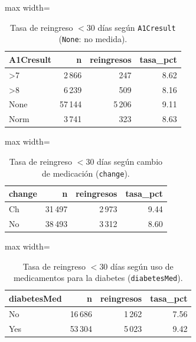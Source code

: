 \documentclass[11pt,a4paper]{article}
\newcommand{\cod}[1]{\texttt{#1}}
\newenvironment{tablaentex}[2]{%
  \begin{table}[H]\centering\small\caption{#1}\label{#2}\begin{adjustbox}{max width=\textwidth}}%
  {\end{adjustbox}\end{table}}
\begin{document}
\begin{tablaentex}{Tasa de reingreso $<30$ días según \cod{A1Cresult} (\cod{None}: no medida).}{tab:a1c}
\begin{tabular}{lrrr}
\toprule
A1Cresult & n & reingresos & tasa\_pct \\
\midrule
\textgreater{}7 & 2\,866 & 247 & 8.62 \\
\textgreater{}8 & 6\,239 & 509 & 8.16 \\
None & 57\,144 & 5\,206 & 9.11 \\
Norm & 3\,741 & 323 & 8.63 \\
\bottomrule
\end{tabular}
\end{tablaentex}
\begin{tablaentex}{Tasa de reingreso $<30$ días según cambio de medicación (\cod{change}).}{tab:ch}
\begin{tabular}{lrrr}
\toprule
change & n & reingresos & tasa\_pct \\
\midrule
Ch & 31\,497 & 2\,973 & 9.44 \\
No & 38\,493 & 3\,312 & 8.60 \\
\bottomrule
\end{tabular}
\end{tablaentex}
\begin{tablaentex}{Tasa de reingreso $<30$ días según uso de medicamentos para la diabetes (\cod{diabetesMed}).}{tab:dm}
\begin{tabular}{lrrr}
\toprule
diabetesMed & n & reingresos & tasa\_pct \\
\midrule
No & 16\,686 & 1\,262 & 7.56 \\
Yes & 53\,304 & 5\,023 & 9.42 \\
\bottomrule
\end{tabular}
\end{tablaentex}
\end{document}
